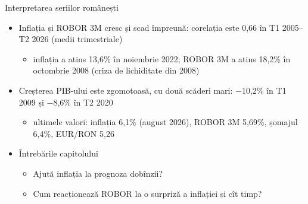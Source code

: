 \begin{frame}{Interpretarea seriilor românești}
\itemsize{\small}
\begin{itemize}
    \item Inflația și ROBOR 3M cresc și scad împreună: corelația este 0{,}66 în T1 2005--T2 2026 (medii trimestriale)
    \begin{itemize}
        \item inflația a atins 13{,}6\% în noiembrie 2022; ROBOR 3M a atins 18{,}2\% în octombrie 2008 (criza de lichiditate din 2008)
    \end{itemize}
    \item Creșterea PIB-ului este zgomotoasă, cu două scăderi mari: $-$10{,}2\% în T1 2009 și $-$8{,}6\% în T2 2020
    \begin{itemize}
        \item ultimele valori: inflația 6{,}1\% (august 2026), ROBOR 3M 5{,}69\%, șomajul 6{,}4\%, EUR/RON 5{,}26
    \end{itemize}
    \item Întrebările capitolului
    \begin{itemize}
        \item Ajută inflația la prognoza dobînzii?
        \item Cum reacționează ROBOR la o surpriză a inflației și cît timp?
    \end{itemize}
\end{itemize}
\end{frame}

